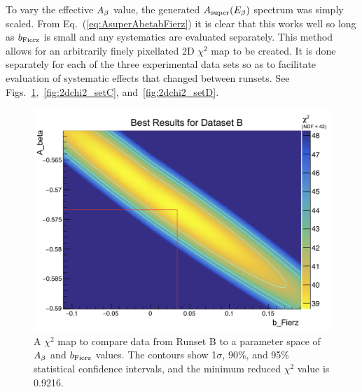 To vary the effective $A_{\beta}$ value, the generated $A_{\mathrm{super}}(E_{\beta})$ spectrum was simply scaled.  From Eq.~(\ref{eq:AsuperAbetabFierz}) it is clear that this works well so long as $b_{\mathrm{Fierz}}$ is small and any systematics are evaluated separately.  This method allows for an arbitrarily finely pixellated 2D $\chi^2$ map to be created.  It is done separately for each of the three experimental data sets so as to facilitate evaluation of systematic effects that changed between runsets.  See Figs.~\ref{fig:2dchi2_setB},~\ref{fig:2dchi2_setC}, and~\ref{fig:2dchi2_setD}.

\begin{figure}[h!tb]
	\centering
	\includegraphics[width=.999\linewidth]
	{Figures/Chi2_2D_SetB.png}
	\caption[$\chi^2$ Map for Runset B]{A $\chi^2$ map to compare data from Runset B to a parameter space of $A_{\beta}$ and $b_{\mathrm{Fierz}}$ values.  The contours show 1$\sigma$, 90\%, and 95\% statistical confidence intervals, and the minimum reduced $\chi^2$ value is 0.9216.  
	}	
	\label{fig:2dchi2_setB}
\end{figure}
%
